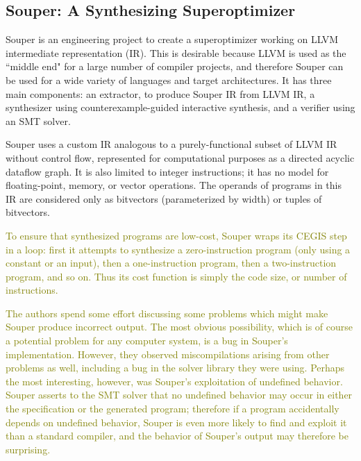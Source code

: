 \documentclass[12pt,twoside]{reedthesis}
\newcommand{\green}[1]{\textcolor{olive}{#1}}
\begin{document}
        \subsection{Souper: A Synthesizing Superoptimizer}
            Souper \cite{sasnauskas2017souper} is an engineering project to create a superoptimizer working on LLVM intermediate representation (IR).
            This is desirable because LLVM is used as the ``middle end" for a large number of compiler projects, and therefore Souper can be used for a wide variety of languages and target architectures.
            It has three main components:
                an extractor, to produce Souper IR from LLVM IR,
                a synthesizer using counterexample-guided interactive synthesis,
                and a verifier using an SMT solver.
            
            Souper uses a custom IR analogous to a purely-functional subset of LLVM IR without control flow\footnotemark, represented for computational purposes as a directed acyclic dataflow graph.
            It is also limited to integer instructions; it has no model for floating-point, memory, or vector operations.
            The operands of programs in this IR are considered only as bitvectors (parameterized by width) or tuples of bitvectors.
            
            
            \green{
            To ensure that synthesized programs are low-cost, Souper wraps its CEGIS step in a loop: first it attempts to synthesize a zero-instruction program (only using a constant or an input), then a one-instruction program, then a two-instruction program, and so on.
            Thus its cost function is simply the code size, or number of instructions.
            }
            
            \green{
            The authors spend some effort discussing some problems which might make Souper produce incorrect output.
            The most obvious possibility, which is of course a potential problem for any computer system, is a bug in Souper's implementation.
            However, they observed miscompilations arising from other problems as well, including a bug in the solver library they were using.
            Perhaps the most interesting, however, was Souper's exploitation of undefined behavior\footnotemark. 
            Souper asserts to the SMT solver that no undefined behavior may occur in either the specification or the generated program; therefore if a program accidentally depends on undefined behavior, Souper is even more likely to find and exploit it than a standard compiler, and the behavior of Souper's output may therefore be surprising.
            }
            
\end{document}
